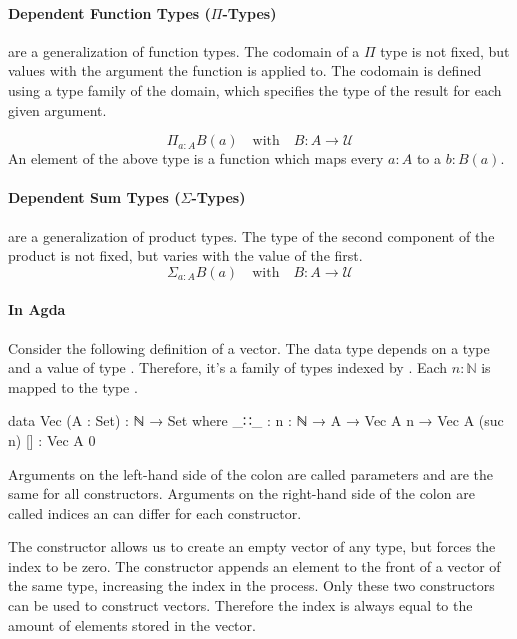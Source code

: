 \documentclass[10pt,a4paper,twoside]{report}
\begin{document}
\paragraph{Dependent Function Types ($\Pi$-Types)} are a generalization of
function types.
The codomain of a $\Pi$ type is not fixed, but values with the argument the
function is applied to.
The codomain is defined using a type family of the domain, which specifies the
type of the result for each given argument.

$$
\Pi_{a : A} B(a) \quad \text{with}\quad B : A \rightarrow\mathcal{U}
$$
An element of the above type is a function which maps every $a : A$ to a $b :
B(a)$.

\paragraph{Dependent Sum Types ($\Sigma$-Types)} are a generalization of product
types.
The type of the second component of the product is not fixed, but varies with
the value of the first.
$$
\Sigma_{a : A} B(a) \quad \text{with}\quad B : A \rightarrow\mathcal{U}
$$

\paragraph{In Agda}

Consider the following definition of a vector.
The data type depends on a type  and a value of type
.
Therefore, it's a family of types indexed by .
Each $n : \mathbb{N}$ is mapped to the type .

\begin{code}
data Vec (A : Set) : ℕ → Set where
  _∷_  : {n : ℕ} → A → Vec A n → Vec A (suc n)
  []   : Vec A 0
\end{code}
Arguments on the left-hand side of the colon are called parameters and are the
same for all constructors.
Arguments on the right-hand side of the colon are called indices an can differ
for each constructor.

The \AgdaInductiveConstructor{[]} constructor allows us to create an empty
vector of any type, but forces the index to be zero.
The  constructor appends an element to the front
of a vector of the same type, increasing the index in the process.
Only these two constructors can be used to construct vectors.
Therefore the index is always equal to the amount of elements stored in the
vector.
\end{document}
